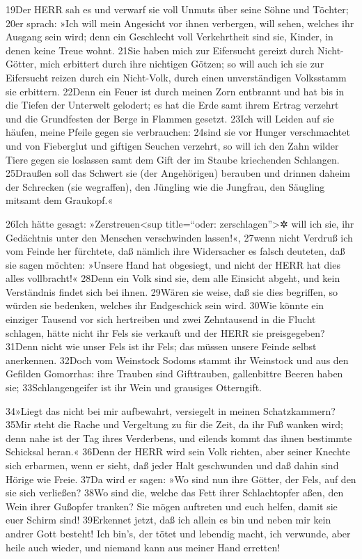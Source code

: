19Der HERR sah es und verwarf sie voll Unmuts über seine Söhne und
Töchter; 20er sprach: »Ich will mein Angesicht vor ihnen verbergen, will
sehen, welches ihr Ausgang sein wird; denn ein Geschlecht voll
Verkehrtheit sind sie, Kinder, in denen keine Treue wohnt. 21Sie haben
mich zur Eifersucht gereizt durch Nicht-Götter, mich erbittert durch
ihre nichtigen Götzen; so will auch ich sie zur Eifersucht reizen durch
ein Nicht-Volk, durch einen unverständigen Volksstamm sie erbittern.
22Denn ein Feuer ist durch meinen Zorn entbrannt und hat bis in die
Tiefen der Unterwelt gelodert; es hat die Erde samt ihrem Ertrag
verzehrt und die Grundfesten der Berge in Flammen gesetzt. 23Ich will
Leiden auf sie häufen, meine Pfeile gegen sie verbrauchen: 24sind sie
vor Hunger verschmachtet und von Fieberglut und giftigen Seuchen
verzehrt, so will ich den Zahn wilder Tiere gegen sie loslassen samt dem
Gift der im Staube kriechenden Schlangen. 25Draußen soll das Schwert sie
(der Angehörigen) berauben und drinnen daheim der Schrecken (sie
wegraffen), den Jüngling wie die Jungfrau, den Säugling mitsamt dem
Graukopf.«

26Ich hätte gesagt: »Zerstreuen\textless sup title=``oder:
zerschlagen''\textgreater✲ will ich sie, ihr Gedächtnis unter den
Menschen verschwinden lassen!«, 27wenn nicht Verdruß ich vom Feinde her
fürchtete, daß nämlich ihre Widersacher es falsch deuteten, daß sie
sagen möchten: »Unsere Hand hat obgesiegt, und nicht der HERR hat dies
alles vollbracht!« 28Denn ein Volk sind sie, dem alle Einsicht abgeht,
und kein Verständnis findet sich bei ihnen. 29Wären sie weise, daß sie
dies begriffen, so würden sie bedenken, welches ihr Endgeschick sein
wird. 30Wie könnte ein einziger Tausend vor sich hertreiben und zwei
Zehntausend in die Flucht schlagen, hätte nicht ihr Fels sie verkauft
und der HERR sie preisgegeben? 31Denn nicht wie unser Fels ist ihr Fels;
das müssen unsere Feinde selbst anerkennen. 32Doch vom Weinstock Sodoms
stammt ihr Weinstock und aus den Gefilden Gomorrhas: ihre Trauben sind
Gifttrauben, gallenbittre Beeren haben sie; 33Schlangengeifer ist ihr
Wein und grausiges Otterngift.

34»Liegt das nicht bei mir aufbewahrt, versiegelt in meinen
Schatzkammern? 35Mir steht die Rache und Vergeltung zu für die Zeit, da
ihr Fuß wanken wird; denn nahe ist der Tag ihres Verderbens, und eilends
kommt das ihnen bestimmte Schicksal heran.« 36Denn der HERR wird sein
Volk richten, aber seiner Knechte sich erbarmen, wenn er sieht, daß
jeder Halt geschwunden und daß dahin sind Hörige wie Freie. 37Da wird er
sagen: »Wo sind nun ihre Götter, der Fels, auf den sie sich verließen?
38Wo sind die, welche das Fett ihrer Schlachtopfer aßen, den Wein ihrer
Gußopfer tranken? Sie mögen auftreten und euch helfen, damit sie euer
Schirm sind! 39Erkennet jetzt, daß ich allein es bin und neben mir kein
andrer Gott besteht! Ich bin's, der tötet und lebendig macht, ich
verwunde, aber heile auch wieder, und niemand kann aus meiner Hand
erretten!

